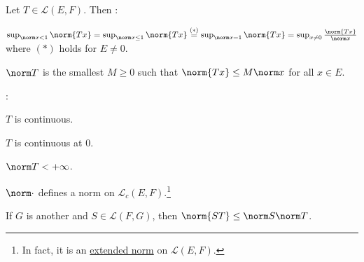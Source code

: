 	
	\begin{prp}\label{PRP: norm on L_c(E; F)}
		Let $T\in\mathcal L(E, F)$. Then \tfh:
		\begin{mylist}
			\item\label{PRPi: norm on L_c(E; F)}
			$\sup_{\norm x < 1}\norm{Tx}
			 = \sup_{\norm x\le 1}\norm{Tx}
			 \stackrel{(*)}{=}
			 \sup_{\norm x = 1}\norm{Tx}
			 = \sup_{x\ne 0}\frac{\norm{Tx}}{\norm x}$ where $(*)$ holds for $E\ne 0$.
			
			\item\label{PRPii: norm on L_c(E; F)} 
			$\norm T$ is the smallest $M\ge 0$ such that $\norm{Tx}\le M\norm x$ for all $x\in E$.
			
			\item\label{PRPiii: norm on L_c(E; F)} 
			\Tfae:
			\begin{mylist}
				\item\label{PRPiii.a: norm on L_c(E; F)} $T$ is continuous.
				\item\label{PRPiii.b: norm on L_c(E; F)} $T$ is continuous at $0$.
				\item\label{PRPiii.c: norm on L_c(E; F)} $\norm T < +\infty$.
			\end{mylist}
			
			\item\label{PRPiv: norm on L_c(E; F)} 
			$\norm\cdot$ defines a norm on $\mathcal L_c(E, F)$.\footnote{In fact, it is an \href{https://math.stackexchange.com/a/1221851/673223}{extended norm} on $\mathcal L(E, F)$.}
			
			\item\label{PRPv: norm on L_c(E; F)} 
			If $G$ is another \NLS and $S\in\mathcal L(F, G)$, then $\norm{ST}\le \norm S\norm T$.
		\end{mylist}
	\end{prp}
	
